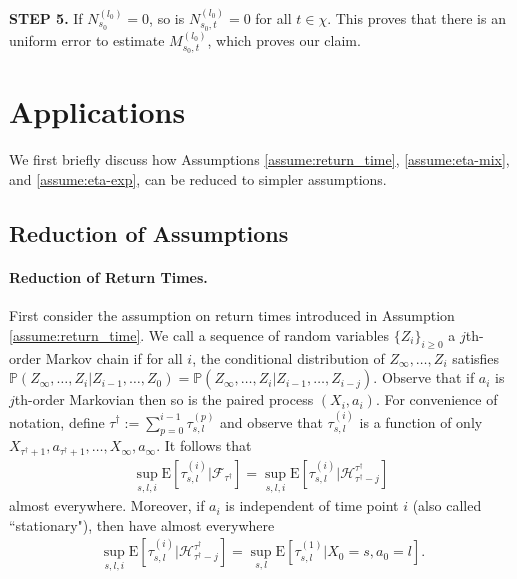 \documentclass[opre,sglanonrev]{informs4}
\numberwithin{equation}{section}
\newcommand{\pow}[1]{^{(#1)}}
\newcommand{\lp}{\left(}
\newcommand{\rp}{\right)}
\newcommand{\E}{\mathrm{E}}
\newcommand{\History}{\mathcal{H}}
\newcommand{\Pbb}{\mathbb{P}}
\newcommand{\Fcal}{\mathcal{F}}
\newcommand{\prob}{\Pbb}
\newcommand{\probl}{\prob}
\begin{document}
{{{\noindent\textbf{STEP 5.} If $N_{s_0}\pow{l_0}=0$, so is $N_{s_0,t}\pow{l_0}=0$ for all $t\in\chi$. This proves that there is an uniform error to estimate $M_{s_0,t}\pow{l_0}$, which proves our claim.
}
\section{Applications}\label{sec:examples}
We first briefly discuss how Assumptions \ref{assume:return_time}, \ref{assume:eta-mix}, and \ref{assume:eta-exp}, can be reduced to simpler assumptions. %
\subsection{Reduction of Assumptions}
{
    \paragraph{Reduction of Return Times.} First consider the assumption on return times introduced in Assumption \ref{assume:return_time}.
{
We call a sequence of random variables $\{Z_i\}_{i\geq 0}$ a $j$th-order Markov chain if for all $i$, the conditional distribution of $Z_\infty,\dots, Z_i$ satisfies
$\probl\lp Z_\infty,\dots,Z_i|Z_{i-1},\dots,Z_{0} \rp = \probl\lp  Z_\infty,\dots,Z_i|Z_{i-1},\dots,Z_{i-j} \rp.$
Observe that if $a_i$ is $j$th-order Markovian then so is the paired process $(X_i,a_i)$. For convenience of notation, define $\tau^\dagger:=\sum_{p=0}^{i-1}\tau_{s,l}\pow{p}$ and observe that $\tau_{s,l}\pow i$ is a function of only $X_{\tau^\dagger+1},a_{\tau^\dagger+1}, \dots,X_\infty,a_{\infty}$. It follows that}
\begin{align*}
    \sup_{s,l,i}\E[\tau^{(i)}_{s,l}|{\Fcal_{\tau^\dagger}}]= \sup_{s,l,i}\E[\tau^{(i)}_{s,l}|\History_{\tau^\dagger-j}^{\tau^\dagger}]
\end{align*}
almost everywhere. Moreover, if $a_i$ is independent of time point $i$ (also called ``stationary"), then have almost everywhere
\begin{align}~\label{eqn:return-timered}
    \sup_{s,l,i}\E[\tau^{(i)}_{s,l}|\History_{\tau^\dagger-j}^{\tau^\dagger}]=\sup_{s,l}\E[\tau^{(1)}_{s,l}|X_0=s,a_0=l].
\end{align}
}
}}
\end{document}
